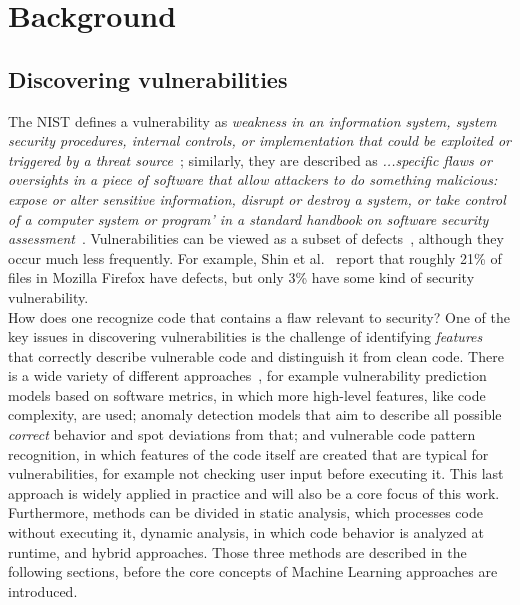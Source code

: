 \documentclass[
a4paper,
pagesize,
pdftex,
12pt,
ngerman,
fleqn,
final,
]{scrartcl}
\begin{document}
	\newpage
	\section{Background}\label{Background}
	
	\subsection{Discovering vulnerabilities}
	
	The NIST defines a vulnerability as \textit{weakness in an information system, system security procedures, internal controls, or implementation that could be exploited or triggered by a threat source}~\cite{NISTComputerSecurityRessourceCenter.}; similarly, they are described as \textit{...specific flaws or oversights in a piece of software that allow attackers to do something malicious: expose or alter sensitive information, disrupt or destroy a system, or take control of a computer system or program' in a standard handbook on software security assessment}~\cite{Dowd.2006}.
	Vulnerabilities can be viewed as a subset of defects~\cite{Morrison.2015}, although they occur much less frequently. For example, Shin et al.~\cite{Shin.2013} report that roughly 21\% of files in Mozilla Firefox have defects, but only 3\% have some kind of security vulnerability. \\
	How does one recognize code that contains a flaw relevant to security? One of the key issues in discovering vulnerabilities is the challenge of identifying \textit{features} that correctly describe vulnerable code and distinguish it from clean code. There is a wide variety of different approaches~\cite{Ghaffarian.2017}, for example vulnerability prediction models based on software metrics, in which more high-level features, like code complexity, are used; anomaly detection models that aim to describe all possible \textit{correct} behavior and spot deviations from that; and vulnerable code pattern recognition, in which features of the code itself are created that are typical for vulnerabilities, for example not checking user input before executing it. This last approach is widely applied in practice and will also be a core focus of this work.\\
	Furthermore, methods can be divided in static analysis, which processes code without executing it, dynamic analysis, in which code behavior is analyzed at runtime, and hybrid approaches. Those three methods are described in the following sections, before the core concepts of Machine Learning approaches are introduced.
\end{document}
